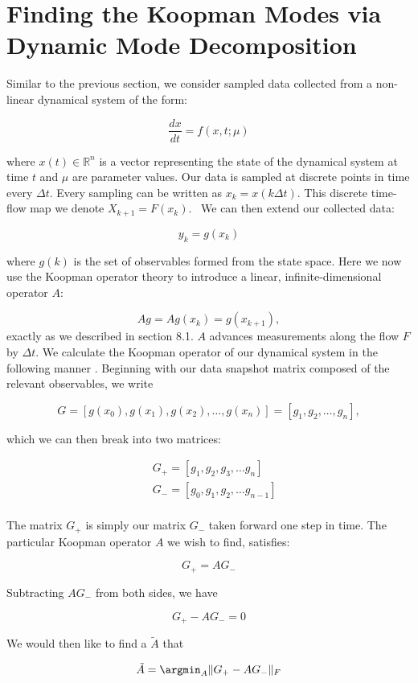\section{Finding the Koopman Modes via Dynamic Mode Decomposition}
Similar to the previous section, we consider sampled data collected from a non-linear dynamical system
of the form:

$$
\frac{dx}{dt} = f(x,t; \mu)
$$

\noindent where $x(t)\in \mathbb{R}^{n}$ is a vector representing the state of the dynamical system
at time $t$ and $\mu$ are parameter values.
 Our data is sampled at discrete points in time every $\Delta t$. Every sampling can be written as $x_{k} = x(k \Delta t)$. This 
discrete time-flow map we denote $X_{k+1} = F(x_k)$. \
We can then extend our collected data:

$$
y_k = g(x_k)
$$

\noindent where $g(k)$ is the set of observables formed from the state space. 
Here we now use the Koopman operator theory to introduce a
 linear, infinite-dimensional operator $A$:

$$
A g = A g(x_k) = g(x_{k+1}),
$$
\noindent exactly as we described in section 8.1. $A$ advances measurements along the flow $F$ by $\Delta t$.
We calculate the Koopman operator of our dynamical system in the following manner \cite{brunton2021modern}.
Beginning with our data snapshot matrix composed of the relevant observables, we write

$$
G = [g(x_0), g(x_1), g(x_2), \dots ,g(x_n)] = [g_1,g_2,\dots, g_n],
$$

\noindent which we can then break into two matrices:

\begin{align*}
    & G_+ = [g_1, g_2, g_3, \dots g_n]\\
    & G_- = [g_0, g_1, g_2, \dots g_{n-1}]\\\
\end{align*}

\noindent The matrix $G_+$ is simply our matrix $G_-$ taken forward one step in time. 
The particular Koopman operator ${A}$ we wish to find, satisfies:

$$
G_+ = AG_-
$$

\noindent Subtracting $AG_-$ from both sides, we have

$$
G_+ - {A}G_- = 0
$$

\noindent We would then like to find a ${\tilde A}$ that 

$$
{\tilde A} = {\argmin_{A}} \|G_+ - {A}G_- \|_{F}
$$

